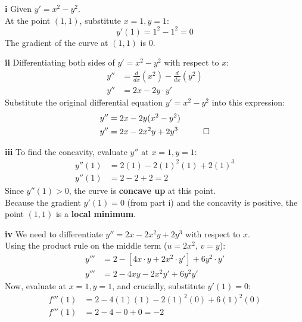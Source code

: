 \begin{solution}
\textbf{i} Given $y' = x^2 - y^2$. \\
At the point $(1, 1)$, substitute $x=1, y=1$:
\[ y'(1) = 1^2 - 1^2 = 0 \]
The gradient of the curve at $(1,1)$ is $0$.

\vspace{0.3cm}
\textbf{ii} Differentiating both sides of $y' = x^2 - y^2$ with respect to $x$:
\begin{align*}
    y'' &= \frac{d}{dx}(x^2) - \frac{d}{dx}(y^2) \\
    y'' &= 2x - 2y \cdot y'
\end{align*}
Substitute the original differential equation $y' = x^2 - y^2$ into this expression:
\begin{align*}
    y'' &= 2x - 2y(x^2 - y^2) \\
    y'' &= 2x - 2x^2 y + 2y^3 \quad \qed
\end{align*}

\vspace{0.3cm}
\textbf{iii} To find the concavity, evaluate $y''$ at $x=1, y=1$:
\begin{align*}
    y''(1) &= 2(1) - 2(1)^2(1) + 2(1)^3 \\
    y''(1) &= 2 - 2 + 2 = 2
\end{align*}
Since $y''(1) > 0$, the curve is \textbf{concave up} at this point. \\
Because the gradient $y'(1) = 0$ (from part i) and the concavity is positive, the point $(1, 1)$ is a \textbf{local minimum}.

\vspace{0.3cm}
\textbf{iv} We need to differentiate $y'' = 2x - 2x^2 y + 2y^3$ with respect to $x$. \\
Using the product rule on the middle term ($u = 2x^2$, $v = y$):
\begin{align*}
    y''' &= 2 - \left[4x \cdot y + 2x^2 \cdot y'\right] + 6y^2 \cdot y' \\
    y''' &= 2 - 4xy - 2x^2 y' + 6y^2 y'
\end{align*}
Now, evaluate at $x=1, y=1$, and crucially, substitute $y'(1) = 0$:
\begin{align*}
    f'''(1) &= 2 - 4(1)(1) - 2(1)^2(0) + 6(1)^2(0) \\
    f'''(1) &= 2 - 4 - 0 + 0 = -2
\end{align*}
\end{solution}

